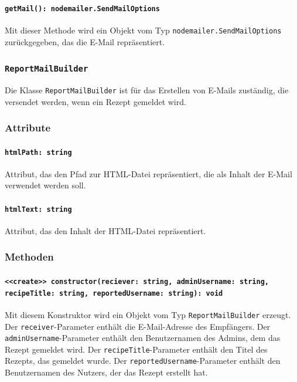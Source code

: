 \documentclass{entwurfsheft}
\begin{document}
\paragraph{\texttt{getMail(): nodemailer.SendMailOptions}}\label{sec:getMail}
Mit dieser Methode wird ein Objekt vom Typ \texttt{nodemailer.SendMailOptions} zurückgegeben, das die E-Mail repräsentiert.

\subsubsection{\texttt{ReportMailBuilder}}\label{sec:ReportMailBuilder}
Die Klasse \texttt{ReportMailBuilder} ist für das Erstellen von E-Mails zuständig, die versendet werden, wenn ein Rezept gemeldet wird.
\subsubsection*{Attribute}
\paragraph{\texttt{htmlPath: string}}
Attribut, das den Pfad zur HTML-Datei repräsentiert, die als Inhalt der E-Mail verwendet werden soll.
\paragraph{\texttt{htmlText: string}}
Attribut, das den Inhalt der HTML-Datei repräsentiert.

\subsubsection*{Methoden}
\paragraph{\texttt{<<create>> constructor(reciever: string, adminUsername: string, recipeTitle: string, reportedUsername: string): void}}
Mit diesem Konstruktor wird ein Objekt vom Typ \texttt{ReportMailBuilder} erzeugt. Der \texttt{receiver}-Parameter enthält die E-Mail-Adresse des Empfängers. Der \texttt{adminUsername}-Parameter enthält den Benutzernamen des Admins, dem das Rezept gemeldet wird. Der \texttt{recipeTitle}-Parameter enthält den Titel des Rezepts, das gemeldet wurde. Der \texttt{reportedUsername}-Parameter enthält den Benutzernamen des Nutzers, der das Rezept erstellt hat.
\end{document}
